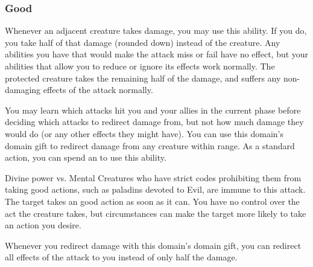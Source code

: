         \subsubsection{Good}
             Whenever an adjacent creature takes damage, you may use this ability.
            If you do, you take half of that damage (rounded down) instead of the creature.
            Any abilities you have that would make the attack miss or fail have no effect, but your abilities that allow you to reduce or ignore its effects work normally.
            The protected creature takes the remaining half of the damage, and suffers any non-damaging effects of the attack normally.
            \par You may learn which attacks hit you and your allies in the current phase before deciding which attacks to redirect damage from, but not how much damage they would do (or any other effects they might have).
             You can use this domain's domain gift to redirect damage from any creature within \rngclose range.
             As a standard action, you can spend an  to use this ability.
            \begin{ability}
                \begin{spelltargetinginfo}
                \end{spelltargetinginfo}
                \begin{spelleffects}
                    \begin{spellattack}{Divine power vs. Mental}
                        \spellspecial Creatures who have strict codes prohibiting them from taking good actions, such as paladins devoted to Evil, are immune to this attack.
                        \spellsuccess The target takes an good action as soon as it can.
                        You have no control over the act the creature takes, but circumstances can make the target more likely to take an action you desire.
                    \end{spellattack}
                \end{spelleffects}
            \end{ability}
             Whenever you redirect damage with this domain's domain gift, you can redirect all effects of the attack to you instead of only half the damage.


